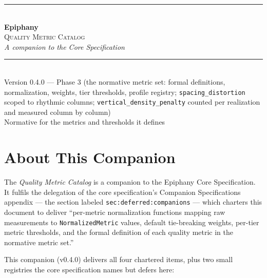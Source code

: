 \documentclass[11pt,letterpaper]{report}
\newcommand{\sectionsc}[1]{{\addfontfeatures{Letters=SmallCaps}#1}}
\begin{document}
\begin{titlepage}
  \thispagestyle{empty}
  \centering
  \vspace*{2.2in}
  {\color{epiphanygold}\rule{3in}{0.8pt}}\\[18pt]
  {\titlefont\fontsize{34pt}{38pt}\selectfont\color{epiphanyteal}\bfseries Epiphany}\\[10pt]
  {\Large\scshape\color{epiphanyslate}Quality Metric Catalog}\\[6pt]
  {\large\itshape\color{epiphanyslate}A companion to the Core Specification}\\[14pt]
  {\color{epiphanygold}\rule{3in}{0.8pt}}\\[24pt]
  {\normalsize\color{epiphanyink}Version 0.4.0 --- Phase 3 (the normative metric set: formal definitions, normalization, weights, tier thresholds, profile registry; \texttt{spacing\_distortion} scoped to rhythmic columns; \texttt{vertical\_density\_penalty} counted per realization and measured column by column)}\\[4pt]
  {\small\color{epiphanyslate}Normative for the metrics and thresholds it defines}
  \vfill
\end{titlepage}

\tableofcontents

\chapter{About This Companion}
\label{ch:about}

The \emph{Quality Metric Catalog} is a companion to the Epiphany Core
Specification. It fulfils the delegation of the core specification's
\sectionsc{Companion Specifications} appendix --- the section labeled
\texttt{sec:deferred:companions} --- which charters this document to
deliver ``per-metric normalization functions mapping raw measurements to
\texttt{NormalizedMetric} values, default tie-breaking weights, per-tier
metric thresholds, and the formal definition of each quality metric in the
normative metric set.''

This companion (v0.4.0) delivers all four chartered items, plus two small
registries the core specification names but defers here:
\end{document}
